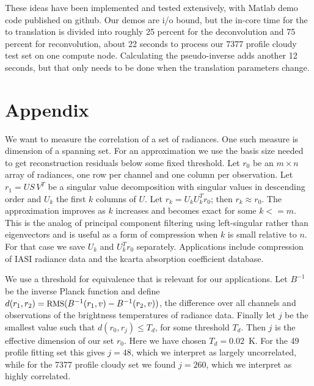 \documentclass[10pt,twocolumn]{article}  %
\begin{document}
These ideas have been implemented and tested extensively, with
Matlab demo code published on github.  Our demos are i/o bound, but
the in-core time for the {\airs} to {\cris} translation is divided
into roughly 25 percent for the deconvolution and 75 percent for
reconvolution, about 22 seconds to process our 7377 profile cloudy
test set on one compute node.  Calculating the pseudo-inverse adds
another 12 seconds, but that only needs to be done when the
translation parameters change.

\FloatBarrier
\section{Appendix}
\label{append}

We want to measure the correlation of a set of radiances.  One such
measure is dimension of a spanning set.  For an approximation we use
the basis size needed to get reconstruction residuals below some
fixed threshold.  Let $r_0$ be an $m \times n$ array of radiances,
one row per channel and one column per observation.  Let $r_1 = U
S\,V^T$ be a singular value decomposition with singular values in
descending order and $U_k$ the first $k$ columns of $U$.  Let $r_k =
U_k U_k^T r_0$; then $r_k \approx r_0$.  The approximation improves
as $k$ increases and becomes exact for some $k <= m$.  This is the
analog of principal component filtering using left-singular rather
than eigenvectors and is useful as a form of compression when $k$ is
small relative to $n$.  For that case we save $U_k$ and $U_k^T r_0$
separately.  Applications include compression of IASI radiance data
and the kcarta absorption coefficient database.

We use a threshold for equivalence that is relevant for our
applications.  Let $B^{-1}$ be the inverse Planck function and
define $d(r_1, r_2) = \mbox{\small RMS}(B^{-1}(r_1, v) - B^{-1}(r_2, v))$, the
{\rms} difference over all channels and observations of the
brightness temperatures of radiance data.  Finally let $j$ be the
smallest value such that $d(r_0, r_j) \le T_d$, for some threshold
$T_d$.  Then $j$ is the effective dimension of our set $r_0$.  Here
we have chosen $T_d = 0.02$~K.  For the 49 profile fitting set this
gives $j=48$, which we interpret as largely uncorrelated, while for
the 7377 profile cloudy set we found $j=260$, which we interpret as
highly correlated.

\FloatBarrier


\end{document}
